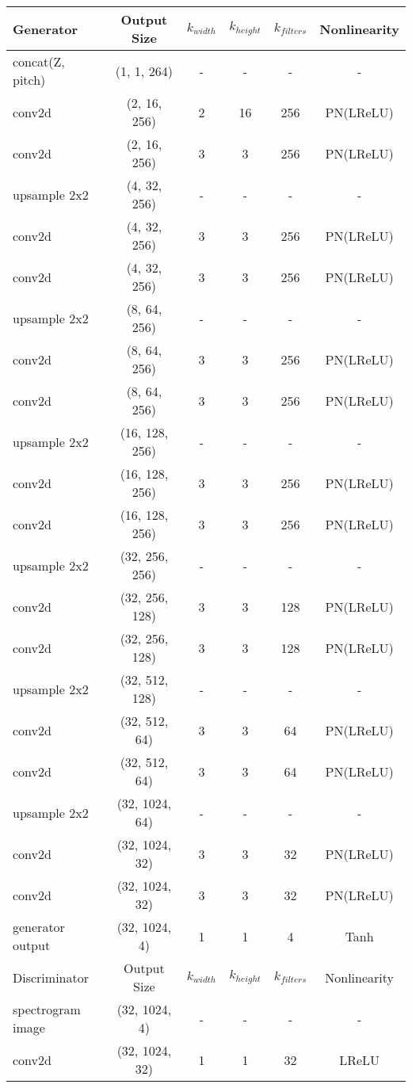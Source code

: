 \begin{table*}[ht!]
    \centering
    \begin{tabular}{l c c c c c}
  \toprule
  Generator & Output Size & $k_{width}$ & $k_{height}$ & $k_{filters}$ & Nonlinearity \\
  \midrule
  concat(Z, pitch) & (1, 1, 264) & - & - & - & - \\
  conv2d & (2, 16, 256) & 2 & 16 & 256 & PN(LReLU) \\
  conv2d & (2, 16, 256) & 3 & 3 & 256 & PN(LReLU) \\
  upsample 2x2 & (4, 32, 256) & - & - & - & - \\
  conv2d & (4, 32, 256) & 3 & 3 & 256 & PN(LReLU) \\
  conv2d & (4, 32, 256) & 3 & 3 & 256 & PN(LReLU) \\
  upsample 2x2 & (8, 64, 256) & - & - & - & - \\
  conv2d & (8, 64, 256) & 3 & 3 & 256 & PN(LReLU) \\
  conv2d & (8, 64, 256) & 3 & 3 & 256 & PN(LReLU) \\
  upsample 2x2 & (16, 128, 256) & - & - & - & - \\
  conv2d & (16, 128, 256) & 3 & 3 & 256 & PN(LReLU) \\
  conv2d & (16, 128, 256) & 3 & 3 & 256 & PN(LReLU) \\
  upsample 2x2 & (32, 256, 256) & - & - & - & - \\
  conv2d & (32, 256, 128) & 3 & 3 & 128 & PN(LReLU) \\
  conv2d & (32, 256, 128) & 3 & 3 & 128 & PN(LReLU) \\
  upsample 2x2 & (32, 512, 128) & - & - & - & - \\
  conv2d & (32, 512, 64) & 3 & 3 & 64 & PN(LReLU) \\
  conv2d & (32, 512, 64) & 3 & 3 & 64 & PN(LReLU) \\
  upsample 2x2 & (32, 1024, 64) & - & - & - & - \\
  conv2d & (32, 1024, 32) & 3 & 3 & 32 & PN(LReLU) \\
  conv2d & (32, 1024, 32) & 3 & 3 & 32 & PN(LReLU) \\  
  generator output & (32, 1024, 4) & 1 & 1 & 4 & Tanh \\ 
  \toprule
  Discriminator & Output Size & $k_{width}$ & $k_{height}$ & $k_{filters}$ & Nonlinearity \\ 
  \midrule
  spectrogram image & (32, 1024, 4) & - & - & - & - \\
  conv2d & (32, 1024, 32) & 1 & 1 & 32 & LReLU \\

\end{tabular}
\end{table*}
